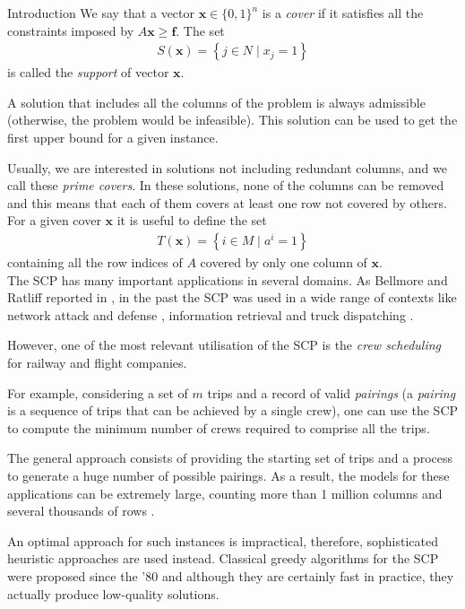 \documentclass[a4paper,12pt]{mydeitesi_eng}
\begin{document}
\begin{chapter}{Introduction}
We say that a vector $\mathbf{x} \in \{0,1\}^n$ is a \emph{cover} if it satisfies all the constraints imposed by $A\mathbf{x} \ge \mathbf{f}$.
The set
\begin{align}
S(\mathbf{x}) = \left\{ j \in N \mid x_j = 1 \right\}
\label{eqn:SupportX}
\end{align}
is called the \emph{support} of vector $\mathbf{x}$.

A solution that includes all the columns of the problem is always admissible (otherwise, the problem would be infeasible).
This solution can be used to get the first upper bound for a given instance.

Usually, we are interested in solutions not including redundant columns, and we call these \emph{prime covers}.
In these solutions, none of the columns can be removed and this means that each of them covers at least one row not covered by others.
For a given cover $\mathbf{x}$ it is useful to define the set
\begin{align}
T\left(\mathbf{x}\right) = \left\{ i \in M \mid a^i = 1 \right\}
\end{align}
containing all the row indices of $A$ covered by only one column of $\mathbf{x}$.\\

The SCP has many important applications in several domains.
As Bellmore and Ratliff reported in \cite{BellmoreRatliff1971}, in the past the SCP was used in a wide range of contexts like network attack and defense \cite{NetworkAttack} \cite{NetworkDefense}, information retrieval \cite{OptimalExtractingDataStorage} and truck dispatching \cite{Dantzig1959}.

However, one of the most relevant utilisation of the SCP is the \emph{crew scheduling} for railway and flight companies.

For example, considering a set of $m$ trips and a record of valid \emph{pairings} (a \emph{pairing} is a sequence of trips that can be achieved by a single crew), one can use the SCP to compute the minimum number of crews required to comprise all the trips.

The general approach consists of providing the starting set of trips and a process to generate a huge number of possible pairings.
As a result, the models for these applications can be extremely large, counting more than 1 million columns and several thousands of rows \cite{FischettiLezioni}.

An optimal approach for such instances is impractical, therefore, sophisticated heuristic approaches are used instead.
Classical greedy algorithms for the SCP were proposed since the '80 \cite{Balas1980-Computational} and although they are certainly fast in practice, they actually produce low-quality solutions.


\end{chapter}
\end{document}

